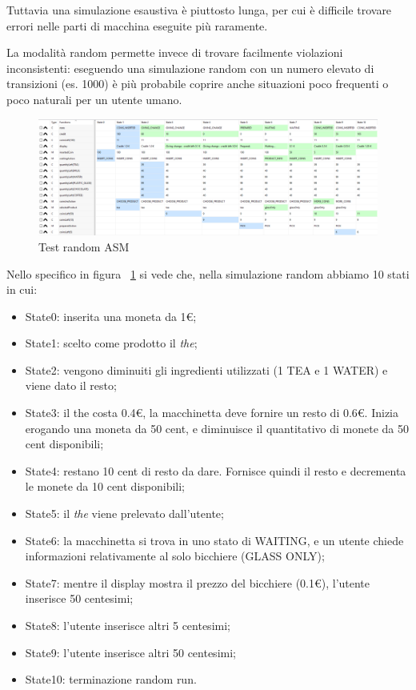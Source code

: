 Tuttavia una simulazione esaustiva è piuttosto lunga, per cui è difficile trovare errori nelle parti di macchina eseguite più raramente.

La modalità random permette invece di trovare facilmente violazioni inconsistenti: eseguendo una simulazione random con un numero elevato di transizioni (es. 1000) è più probabile coprire anche situazioni poco frequenti o poco naturali per un utente umano.

\begin{figure}[h]
	\centering
	\includegraphics[width=1\textwidth]{Immagini/RandomRunASM.png}
	\caption{Test random ASM}
	\label{fig:randomExe}
\end{figure}

Nello specifico in figura ~\ref{fig:randomExe} si vede che, nella simulazione random abbiamo 10 stati in cui:
\begin{itemize}
	\item State0: inserita una moneta da 1€;
	\item State1: scelto come prodotto il \textit{the};
	\item State2: vengono diminuiti gli ingredienti utilizzati (1 TEA e 1 WATER) e viene dato il resto;
	\item State3: il the costa 0.4€, la macchinetta deve fornire un resto di 0.6€. Inizia erogando una moneta da 50 cent, e diminuisce il quantitativo di monete da 50 cent disponibili;
	\item State4: restano 10 cent di resto da dare. Fornisce quindi il resto e decrementa le monete da 10 cent disponibili;
	\item State5: il \textit{the} viene prelevato dall'utente;
	\item State6: la macchinetta si trova in uno stato di WAITING, e un utente chiede informazioni relativamente al solo bicchiere (GLASS ONLY);
	\item State7: mentre il display mostra il prezzo del bicchiere (0.1€), l'utente inserisce 50 centesimi;
	\item State8: l'utente inserisce altri 5 centesimi;
	\item State9: l'utente inserisce altri 50 centesimi;
	\item State10: terminazione random run.
\end{itemize}